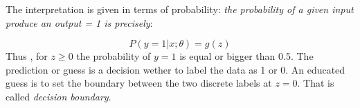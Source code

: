 \documentclass[
10pt, %
a4paper, %
oneside, %
headinclude,footinclude, %
BCOR5mm, %
]{scrartcl}
\begin{document}
The interpretation is given in terms of probability: \textit{the probability of a given input produce an output = 1 is precisely}:

\begin{equation}
    P(y=1|x;\theta) = g(z)
\end{equation}
Thus , for $z \geqslant 0$ the probability of $y=1$ is equal or bigger than 0.5. The prediction or guess is a decision wether to 
label the data as 1 or 0. An educated guess is to set the boundary between the two discrete labels at $z=0$. That is called \textit{decision boundary}.












\end{document}
